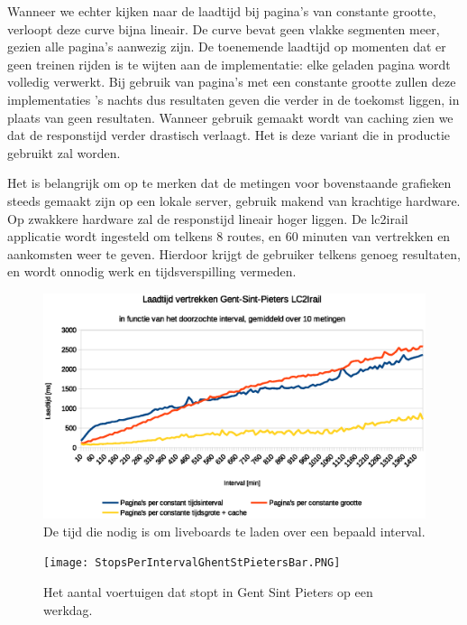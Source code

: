 Wanneer we echter kijken naar de laadtijd bij pagina's van constante grootte, verloopt deze curve bijna lineair. De curve bevat geen vlakke segmenten meer, gezien alle pagina's aanwezig zijn. De toenemende laadtijd op momenten dat er geen treinen rijden is te wijten aan de implementatie: elke geladen pagina wordt volledig verwerkt. Bij gebruik van pagina's met een constante grootte zullen deze implementaties 's nachts dus resultaten geven die verder in de toekomst liggen, in plaats van geen resultaten. Wanneer gebruik gemaakt wordt van caching zien we dat de responstijd verder drastisch verlaagt. Het is deze variant die in productie gebruikt zal worden. 

Het is belangrijk om op te merken dat de metingen voor bovenstaande grafieken steeds gemaakt zijn op een lokale server, gebruik makend van krachtige hardware. Op zwakkere hardware zal de responstijd lineair hoger liggen. De lc2irail applicatie wordt ingesteld om telkens 8 routes, en 60 minuten van vertrekken en aankomsten weer te geven. Hierdoor krijgt de gebruiker telkens genoeg resultaten, en wordt onnodig werk en tijdsverspilling vermeden.

\begin{figure}[h]
	\centering
	\includegraphics[width=1.0\textwidth]{images/Laadtijd_vertrekken.eps}
	\caption[Laadtijd liveboards in functie van het overlopen interval]{De tijd die nodig is om liveboards te laden over een bepaald interval.}
	\label{fig:responsetimeperintervalliveboards}
\end{figure}

\begin{figure}[h]
	\centering
	\texttt{[image: StopsPerIntervalGhentStPietersBar.PNG]}
	\caption[Het aantal voertuigen dat stopt in Gent-St-Pieters]{Het aantal voertuigen dat stopt in Gent Sint Pieters op een werkdag.}
	\label{fig:stopsperintervaldetail}
\end{figure}

